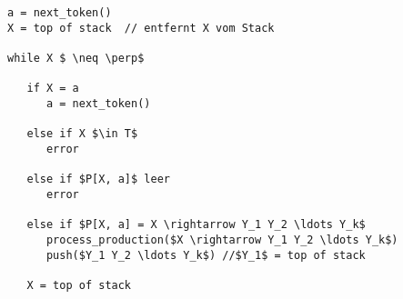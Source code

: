 \documentclass[
border=0.2cm,
convert={density=600}
]{standalone}
\begin{document}
	
	
	\begin{lstlisting}[mathescape,backgroundcolor=\color{lightgray},basicstyle=\scriptsize\ttfamily]
a = next_token()
X = top of stack  // entfernt X vom Stack
	
while X $ \neq \perp$

   if X = a
      a = next_token()  
         
   else if X $\in T$
      error
      
   else if $P[X, a]$ leer
      error
      
   else if $P[X, a] = X \rightarrow Y_1 Y_2 \ldots Y_k$
      process_production($X \rightarrow Y_1 Y_2 \ldots Y_k$)      
      push($Y_1 Y_2 \ldots Y_k$) //$Y_1$ = top of stack

   X = top of stack
\end{lstlisting}
\end{document}
